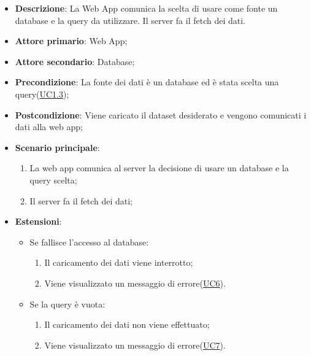 \begin{itemize}

	\item \textbf{Descrizione}: La Web App comunica la scelta di usare come fonte un database e la query da utilizzare. Il server fa il fetch dei dati.
	
    \item \textbf{Attore primario}: Web App;
	\item \textbf{Attore secondario}: Database;
	        
    \item \textbf{Precondizione}:   La fonte dei dati è un database ed è stata scelta una query(\hyperref[ssub:uc1.3]{UC1.3});

    \item \textbf{Postcondizione}:  Viene caricato il dataset desiderato e vengono comunicati i dati alla web app;

	\item \textbf{Scenario principale}:
		\begin{enumerate}
			\item La web app comunica al server la decisione di usare un database e la query scelta;
            \item Il server fa il fetch dei dati;
        \end{enumerate}
		
	\item \textbf{Estensioni}:
		\begin{itemize}
		
			\item Se fallisce l'accesso al database:
			\begin{enumerate}
				
				\item Il caricamento dei dati viene interrotto;
				\item Viene visualizzato un messaggio di errore(\hyperref[sub:uc6]{UC6}).
				
			\end{enumerate}
		
			\item Se la query è vuota:
			\begin{enumerate}
				
				\item Il caricamento dei dati non viene effettuato;
				\item Viene visualizzato un messaggio di errore(\hyperref[sub:uc7]{UC7}).
				
			\end{enumerate}
		
		\end{itemize}
			
\end{itemize}